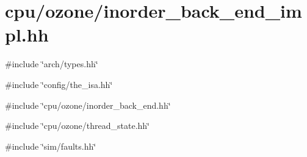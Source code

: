 \hypertarget{inorder__back__end__impl_8hh}{
\section{cpu/ozone/inorder\_\-back\_\-end\_\-impl.hh}
\label{inorder__back__end__impl_8hh}
}
{\ttfamily \#include \char`\"{}arch/types.hh\char`\"{}}\par
{\ttfamily \#include \char`\"{}config/the\_\-isa.hh\char`\"{}}\par
{\ttfamily \#include \char`\"{}cpu/ozone/inorder\_\-back\_\-end.hh\char`\"{}}\par
{\ttfamily \#include \char`\"{}cpu/ozone/thread\_\-state.hh\char`\"{}}\par
{\ttfamily \#include \char`\"{}sim/faults.hh\char`\"{}}\par
